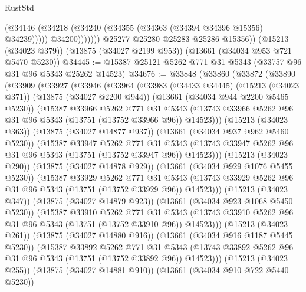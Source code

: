 \begin{lexlean}{RustStd}
\begin{coremodule}
                      (@34146 (@34218 (@34240 (@34355 (@34363 (@34394 @34396 @15356) @34239)))))
                      @34200)))))))
        @25277
        @25280
        @25283
        @25286
        @15356))
    (@15213 (@34023 @379))
    (@13875 (@34027 @2199 @953))
    (@13661 (@34034 @953 @721 @5470 @5230))
@34445 := @15387 @25121 @5262 @771 @31 @5343 (@33757 @96 @31 @96 @5343 @25262 @14523)
@34676 := @33848
    (@33860
      (@33872
        (@33890
          (@33909
            (@33927
              (@33946
                (@33964
                  (@33983
                    (@34433 @34445)
                    (@15213 (@34023 @371))
                    (@13875 (@34027 @2200 @944))
                    (@13661 (@34034 @944 @2200 @5465 @5230))
                    (@15387
                      @33966
                      @5262
                      @771
                      @31
                      @5343
                      (@13743 @33966 @5262 @96 @31 @96 @5343 (@13751 (@13752 @33966 @96)) @14523)))
                  (@15213 (@34023 @363))
                  (@13875 (@34027 @14877 @937))
                  (@13661 (@34034 @937 @962 @5460 @5230))
                  (@15387
                    @33947
                    @5262
                    @771
                    @31
                    @5343
                    (@13743 @33947 @5262 @96 @31 @96 @5343 (@13751 (@13752 @33947 @96)) @14523)))
                (@15213 (@34023 @290))
                (@13875 (@34027 @14878 @929))
                (@13661 (@34034 @929 @1076 @5455 @5230))
                (@15387
                  @33929
                  @5262
                  @771
                  @31
                  @5343
                  (@13743 @33929 @5262 @96 @31 @96 @5343 (@13751 (@13752 @33929 @96)) @14523)))
              (@15213 (@34023 @347))
              (@13875 (@34027 @14879 @923))
              (@13661 (@34034 @923 @1068 @5450 @5230))
              (@15387
                @33910
                @5262
                @771
                @31
                @5343
                (@13743 @33910 @5262 @96 @31 @96 @5343 (@13751 (@13752 @33910 @96)) @14523)))
            (@15213 (@34023 @261))
            (@13875 (@34027 @14880 @916))
            (@13661 (@34034 @916 @1187 @5445 @5230))
            (@15387
              @33892
              @5262
              @771
              @31
              @5343
              (@13743 @33892 @5262 @96 @31 @96 @5343 (@13751 (@13752 @33892 @96)) @14523)))
          (@15213 (@34023 @255))
          (@13875 (@34027 @14881 @910))
          (@13661 (@34034 @910 @722 @5440 @5230))

\end{coremodule}
\end{lexlean}
